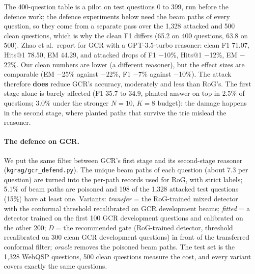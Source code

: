 \documentclass[preprint,12pt]{elsarticle}
\begin{document}
The 400-question table is a pilot on test questions 0 to 399, run before the defence work; the defence experiments below need the beam paths of every question, so they come from a separate pass over the 1{,}328 attacked and 500 clean questions, which is why the clean F1 differs (65.2 on 400 questions, 63.8 on 500). Zhao et al.\ report for GCR with a GPT-3.5-turbo reasoner: clean F1 71.07, Hits@1 78.50, EM 44.29, and attacked drops of F1 $-$10\%, Hits@1 $-$12\%, EM $-$22\%. Our clean numbers are lower (a different reasoner), but the effect sizes are comparable (EM $-$25\% against $-$22\%, F1 $-$7\% against $-$10\%). The attack therefore \textbf{does} reduce GCR's accuracy, moderately and less than RoG's. The first stage alone is barely affected (F1 35.7 to 34.9, planted answer on top in 2.5\% of questions; 3.0\% under the stronger $N=10$, $K=8$ budget): the damage happens in the second stage, where planted paths that survive the trie mislead the reasoner. \paragraph{The defence on GCR.} We put the same filter between GCR's first stage and its second-stage reasoner (\texttt{kgrag/gcr\_defend.py}). The unique beam paths of each question (about 7.3 per question) are turned into the per-path records used for RoG, with strict labels; 5.1\% of beam paths are poisoned and 198 of the 1,328 attacked test questions (15\%) have at least one. Variants: \emph{transfer} = the RoG-trained mixed detector with the conformal threshold recalibrated on GCR development beams; \emph{fitted} = a detector trained on the first 100 GCR development questions and calibrated on the other 200; \emph{D} = the recommended gate (RoG-trained detector, threshold recalibrated on 300 clean GCR development questions) in front of the transferred conformal filter; \emph{oracle} removes the poisoned beam paths. The test set is the 1,328 WebQSP questions, 500 clean questions measure the cost, and every variant covers exactly the same questions.
\end{document}
